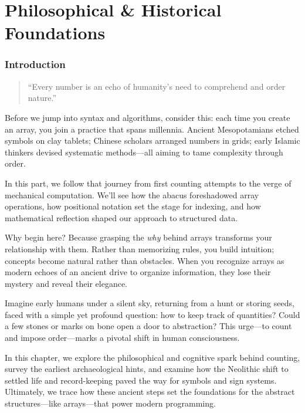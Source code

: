 \part{Philosophical \& Historical Foundations}
\section*{Introduction}
\begin{quote}
	“Every number is an echo of humanity's need to comprehend and order nature.”
\end{quote}

\noindent
Before we jump into syntax and algorithms, consider this: each time you create an array, you join a practice that spans millennia. Ancient Mesopotamians etched symbols on clay tablets; Chinese scholars arranged numbers in grids; early Islamic thinkers devised systematic methods—all aiming to tame complexity through order.

\noindent
In this part, we follow that journey from first counting attempts to the verge of mechanical computation. We’ll see how the abacus foreshadowed array operations, how positional notation set the stage for indexing, and how mathematical reflection shaped our approach to structured data.

\noindent
Why begin here? Because grasping the \emph{why} behind arrays transforms your relationship with them. Rather than memorizing rules, you build intuition; concepts become natural rather than obstacles. When you recognize arrays as modern echoes of an ancient drive to organize information, they lose their mystery and reveal their elegance.

\noindent
Imagine early humans under a silent sky, returning from a hunt or storing seeds, faced with a simple yet profound question: how to keep track of quantities? Could a few stones or marks on bone open a door to abstraction? This urge—to count and impose order—marks a pivotal shift in human consciousness.

\noindent
In this chapter, we explore the philosophical and cognitive spark behind counting, survey the earliest archaeological hints, and examine how the Neolithic shift to settled life and record-keeping paved the way for symbols and sign systems. Ultimately, we trace how these ancient steps set the foundations for the abstract structures—like arrays—that power modern programming.